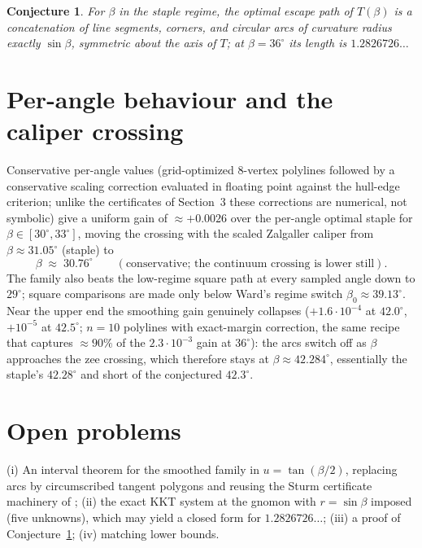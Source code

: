 \documentclass[11pt]{amsart}
\newtheorem{conjecture}[theorem]{Conjecture}
\theoremstyle{remark}
\begin{document}
\begin{conjecture}\label{conj:curvature}
For $\beta$ in the staple regime, the optimal escape path of $T(\beta)$ is a
concatenation of line segments, corners, and circular arcs of curvature
radius exactly $\sin\beta$, symmetric about the axis of $T$; at
$\beta=36^\circ$ its length is $1.2826726\ldots$
\end{conjecture}

\section{Per-angle behaviour and the caliper crossing}
Conservative per-angle values (grid-optimized $8$-vertex polylines followed
by a conservative scaling correction evaluated in floating point against
the hull-edge criterion; unlike the certificates of Section~3 these
corrections are numerical, not symbolic) give a uniform gain of $\approx+0.0026$ over
the per-angle optimal staple for $\beta\in[30^\circ,33^\circ]$, moving the
crossing with the scaled Zalgaller caliper from $\beta\approx31.05^\circ$
(staple) to
\[
  \beta\;\approx\;30.76^\circ\qquad(\text{conservative; the continuum
  crossing is lower still}).
\]
The family also beats the low-regime square path at every sampled angle down
to $29^\circ$; square comparisons are made only below Ward's regime switch
$\beta_0\approx39.13^\circ$. Near the upper end the smoothing gain genuinely collapses
($+1.6\cdot10^{-4}$ at $42.0^\circ$, $+10^{-5}$ at $42.5^\circ$; $n=10$
polylines with exact-margin correction, the same recipe that captures
$\approx90\%$ of the $2.3\cdot10^{-3}$ gain at $36^\circ$): the arcs
switch off as $\beta$ approaches the zee crossing, which therefore stays at
$\beta\approx42.284^\circ$, essentially the staple's $42.28^\circ$ and
short of the conjectured $42.3^\circ$.

\section{Open problems}
(i) An interval theorem for the smoothed family in $u=\tan(\beta/2)$,
replacing arcs by circumscribed tangent polygons and reusing the Sturm
certificate machinery of \cite{Tem26}; (ii) the exact KKT system at the
gnomon with $r=\sin\beta$ imposed (five unknowns), which may yield a closed
form for $1.2826726\ldots$; (iii) a proof of
Conjecture~\ref{conj:curvature}; (iv) matching lower bounds.

\appendix
\end{document}
